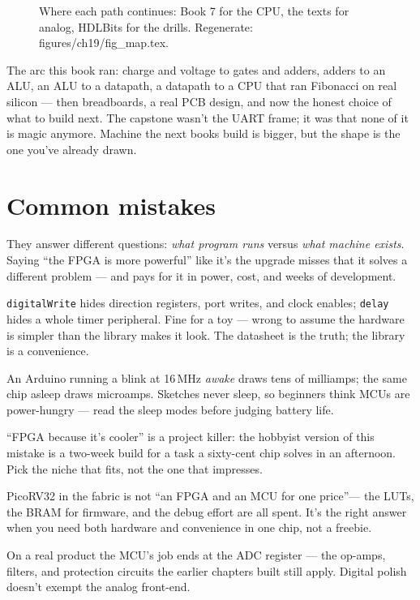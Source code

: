 \begin{figure}[htbp]
\centering

\caption{Where each path continues: Book 7 for the CPU, the texts
for analog, HDLBits for the drills. Regenerate: \ttfamily
figures/ch19/fig\_map.tex.}
\label{fig:map19}
\end{figure}

The arc this book ran: charge and voltage to gates and adders,
adders to an ALU, an ALU to a datapath, a datapath to a CPU that
ran Fibonacci on real silicon --- then breadboards, a real PCB
design, and now the honest choice of what to build next. The
capstone wasn't the UART frame; it was that none of it is magic
anymore. Machine the next books build is bigger, but the shape is
the one you've already drawn.

\section{Common mistakes}\label{sec:cm19}

\begin{tripwire}
They answer different questions: \emph{what program runs} versus
\emph{what machine exists}. Saying ``the FPGA is more powerful''
like it's the upgrade misses that it solves a different problem
--- and pays for it in power, cost, and weeks of development.
\end{tripwire}
\begin{tripwire}
\texttt{digitalWrite} hides direction registers, port writes, and
clock enables; \texttt{delay} hides a whole timer peripheral. Fine
for a toy --- wrong to assume the hardware is simpler than the
library makes it look. The datasheet is the truth; the library is
a convenience.
\end{tripwire}
\begin{tripwire}
An Arduino running a blink at 16\,MHz \emph{awake} draws tens of
milliamps; the same chip asleep draws microamps. Sketches never
sleep, so beginners think MCUs are power-hungry --- read the sleep
modes before judging battery life.
\end{tripwire}
\begin{tripwire}
``FPGA because it's cooler'' is a project killer: the hobbyist
version of this mistake is a two-week build for a task a
sixty-cent chip solves in an afternoon. Pick the niche that fits,
not the one that impresses.
\end{tripwire}
\begin{tripwire}
PicoRV32 in the fabric is not ``an FPGA and an MCU for one
price''--- the LUTs, the BRAM for firmware, and the debug effort
are all spent. It's the right answer when you need both hardware
and convenience in one chip, not a freebie.
\end{tripwire}
\begin{tripwire}
On a real product the MCU's job ends at the ADC register --- the
op-amps, filters, and protection circuits the earlier chapters
built still apply. Digital polish doesn't exempt the analog
front-end.
\end{tripwire}

